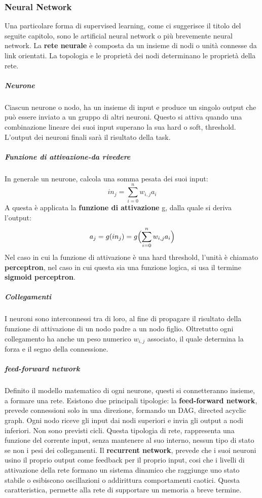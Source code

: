 \documentclass[14pt]{extarticle}
\begin{document}
\subsubsection{Neural Network}
Una particolare forma di supervised learning, come ci suggerisce il titolo del seguite capitolo, sono le artificial neural network o più brevemente neural network. 
La \textbf{rete neurale} è composta da un insieme di nodi o unità connesse da link orientati.\cite{russell2005intelligenza}
 La topologia e le proprietà dei nodi determinano le proprietà della rete.
\subparagraph{Neurone}
Ciascun neurone o nodo, ha un insieme di input e produce un singolo output che può essere inviato a un gruppo di altri neuroni. Questo si attiva quando una combinazione lineare dei suoi input superano la sua hard o soft, threshold. L'output dei neuroni finali sarà il risultato della task.
\subparagraph{Funzione di attivazione-da rivedere}
In generale un neurone, calcola una somma pesata dei suoi input:
\[in_j=\sum_{i=0}^n  w_{i,j}a_{i}\]
A questa è applicata la \textbf{funzione di attivazione} g, dalla quale si deriva l'output:
\[a_j=g(in_j)=g \Bigl (\sum_{i=0}^n  w_{i,j}a_{i} \Bigr )\]
Nel caso in cui la funzione di attivazione è una hard threshold, l'unità è chiamato \textbf{perceptron}, nel caso in cui questa sia una funzione logica, si usa il termine \textbf{sigmoid perceptron}.
\subparagraph{Collegamenti}
I neuroni sono interconnessi tra di  loro,  al fine di  propagare il risultato della funzione di attivazione di un nodo padre a un nodo figlio.
 Oltretutto ogni collegamento ha anche un peso numerico $w_{i,j}$ associato, il quale determina la forza e il segno della connessione.
 
\subparagraph{feed-forward network}
Definito il modello matematico di ogni neurone, questi si connetteranno insieme, a formare una rete.
Esistono due principali tipologie: 
la \textbf{feed-forward network}, prevede connessioni solo in una direzione, formando un DAG, directed acyclic graph. Ogni nodo riceve gli input dai nodi superiori e invia gli output a nodi inferiori. Non sono previsti cicli. Questa tipologia di rete, rappresenta una funzione del corrente input, senza mantenere al suo interno, nessun tipo di stato se non i pesi dei collegamenti.
Il \textbf{recurrent network}, prevede che i suoi neuroni usino il proprio output come feedback per il proprio input, cosi che i livelli di attivazione della rete formano un sistema dinamico che raggiunge uno stato stabile o
esibiscono oscillazioni o addirittura comportamenti caotici. Questa caratteristica, permette alla rete di supportare un memoria a breve termine.

\end{document}
